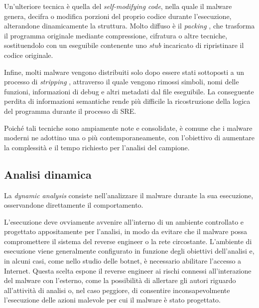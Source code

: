 
Un'ulteriore tecnica è quella del \emph{self-modifying code}, nella quale il malware genera, decifra o modifica porzioni del proprio codice durante l'esecuzione, alterandone dinamicamente la struttura. Molto diffuso è il \emph{packing} \cite{egele2012dynamic}, che trasforma il programma originale mediante compressione, cifratura o altre tecniche, sostituendolo con un eseguibile contenente uno \emph{stub} incaricato di ripristinare il codice originale. %


Infine, molti malware vengono distribuiti solo dopo essere stati sottoposti a un processo di \emph{stripping} \cite{nance2026ghidrabook}, attraverso il quale vengono rimossi simboli, nomi delle funzioni, informazioni di debug e altri metadati dal file eseguibile. La conseguente perdita di informazioni semantiche rende più difficile la ricostruzione della logica del programma durante il processo di SRE. %

Poiché tali tecniche sono ampiamente note e consolidate, è comune che i malware moderni ne adottino una o più contemporaneamente, con l'obiettivo di aumentare la complessità e il tempo richiesto per l'analisi del campione.

\subsection{Analisi dinamica} %

La \emph{dynamic analysis} \cite{sikorski2012malware} consiste nell'analizzare il malware durante la sua esecuzione, osservandone direttamente il comportamento.

L'esecuzione deve ovviamente avvenire all'interno di un ambiente controllato e progettato appositamente per l'analisi, in modo da evitare che il malware possa compromettere il sistema del reverse engineer o la rete circostante. L'ambiente di esecuzione viene generalmente configurato in funzione degli obiettivi dell'analisi e, in alcuni casi, come nello studio delle botnet, è necessario abilitare l'accesso a Internet. Questa scelta espone il reverse engineer ai rischi connessi all'interazione del malware con l'esterno, come la possibilità di allertare gli autori riguardo all'attività di analisi o, nel caso peggiore, di consentire inconsapevolmente l'esecuzione delle azioni malevole per cui il malware è stato progettato.

